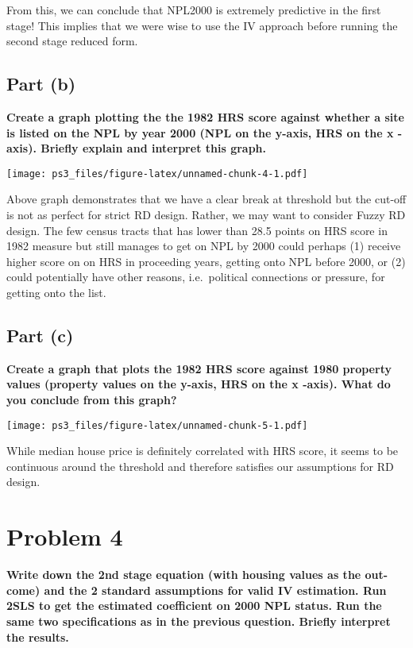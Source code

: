 \documentclass[
]{article}
\begin{document}
From this, we can conclude that NPL2000 is extremely predictive in the
first stage! This implies that we were wise to use the IV approach
before running the second stage reduced form.

\hypertarget{part-b-2}{%
\subsection{Part (b)}\label{part-b-2}}

\textbf{Create a graph plotting the the 1982 HRS score against whether a
site is listed on the NPL by year 2000 (NPL on the y-axis, HRS on the x
-axis). Briefly explain and interpret this graph.}

\texttt{[image: ps3\_files/figure-latex/unnamed-chunk-4-1.pdf]}

Above graph demonstrates that we have a clear break at threshold but the
cut-off is not as perfect for strict RD design. Rather, we may want to
consider Fuzzy RD design. The few census tracts that has lower than 28.5
points on HRS score in 1982 measure but still manages to get on NPL by
2000 could perhaps (1) receive higher score on on HRS in proceeding
years, getting onto NPL before 2000, or (2) could potentially have other
reasons, i.e.~political connections or pressure, for getting onto the
list.

\hypertarget{part-c}{%
\subsection{Part (c)}\label{part-c}}

\textbf{Create a graph that plots the 1982 HRS score against 1980
property values (property values on the y-axis, HRS on the x -axis).
What do you conclude from this graph?}

\texttt{[image: ps3\_files/figure-latex/unnamed-chunk-5-1.pdf]}

While median house price is definitely correlated with HRS score, it
seems to be continuous around the threshold and therefore satisfies our
assumptions for RD design.

\newpage

\hypertarget{problem-4}{%
\section{Problem 4}\label{problem-4}}

\textbf{Write down the 2nd stage equation (with housing values as the
out-come) and the 2 standard assumptions for valid IV estimation. Run
2SLS to get the estimated coefficient on 2000 NPL status. Run the same
two specifications as in the previous question. Briefly interpret the
results.}
\end{document}
